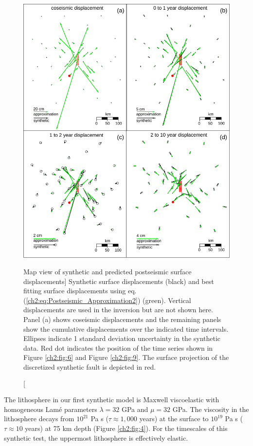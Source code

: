 \begin{figure}
\includegraphics{ch2/figures/Fig5.pdf}
\caption
[Map view of synthetic and predicted postseismic surface
displacements]
{Synthetic surface displacements (black) and best fitting surface
displacements using eq. (\ref{ch2:eq:Postseismic_Approximation2})
(green).  Vertical displacements are used in the inversion but are not
shown here. Panel (a) shows coseismic displacements and the remaining
panels show the cumulative displacements over the indicated time
intervals. Ellipses indicate 1 standard deviation uncertainty in the
synthetic data. Red dot indicates the position of the time series
shown in Figure \ref{ch2:fig:6} and Figure \ref{ch2:fig:9}. The
surface projection of the discretized synthetic fault is depicted in
red.}
\label{ch2:fig:5}
\end{figure}

The lithosphere in our first synthetic model is Maxwell viscoelastic
with homogeneous Lam\'e parameters $\lambda = 32$ GPa and $\mu = 32$
GPa.  The viscosity in the lithosphere decays from $10^{21}$ Pa s
($\tau\approx1,000$ years) at the surface to $10^{19}$ Pa s
($\tau\approx10$ years) at 75 km depth (Figure \ref{ch2:fig:4}).  For
the timescales of this synthetic test, the uppermost lithosphere is
effectively elastic.

